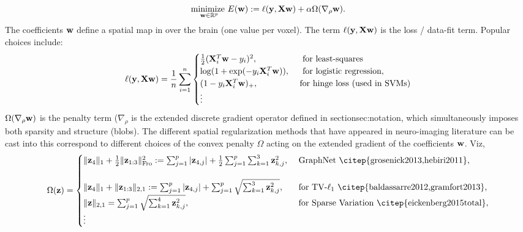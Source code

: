 \begin{equation}
  \underset{\mathbf{w} \in \mathbb R^p}{\text{minimize }}E(\mathbf{w}) := \ell(\mathbf{y},\mathbf{X}\mathbf{w}) + \alpha \Omega(\nabla_\rho\mathbf{w}).
    \label{eq:opt_pb}
\end{equation}
The coefficients ${\mathbf{w}}$ define a spatial map in over the brain (one value per voxel).
The term {$\ell(\mathbf{y},\mathbf{X}\mathbf{w})$} is the
  {loss / data-fit term}. Popular choices include:
  $$
  \ell(\mathbf{y},\mathbf{X}\mathbf{w}) = \frac{1}{n}\sum_{i=1}^n\begin{cases}\frac{1}{2}(\mathbf{X}^T_i\mathbf{w} - y_i)^2,
    &\mbox{ \text{ for least-squares}}\\
    \log(1+\exp(-y_i\mathbf{X}_i^T\mathbf{w})),
    &\mbox{ \text{ for logistic regression}},\\
    (1 - y_i\mathbf{X}^T_i\mathbf{w})_+,&\mbox{\text{ for hinge loss (used in SVMs)}}\\
      \vdots\end{cases}
    $$
$\Omega(\nabla_\rho\mathbf{w})$ is the penalty term ($\nabla_\rho$ is the extended discrete gradient operator defined in section{sec:notation}, which simultaneously imposes both sparsity and structure (blobs). The different spatial regularization
methods that have appeared in neuro-imaging literature can be cast into this
correspond to different choices of the convex penalty $\Omega$ acting on the extended gradient of the coefficients $\mathbf{w}$. Viz,
\[
  \begin{split}
  \Omega(\z) = \begin{cases}
      \|\z_4\|_1 + \frac{1}{2}\|\z_{1:3}\|_{\text{Fro}}^2 := \sum_{j=1}^p|\z_{4,j}| + \frac{1}{2}\sum_{j=1}^{p}\sum_{k=1}^3\z_{k,j}^2, &\mbox{ GraphNet  \citep{grosenick2013,hebiri2011}},\\\\
      \|\z_4\|_1 + \|\z_{1:3}\|_{2,1} := \sum_{j=1}^p|\z_{4,j}| + \sum_{j=1}^{p}\sqrt{\sum_{k=1}^3\z_{k,j}^2}, &\mbox{ for TV-$\ell_1$  \citep{baldassarre2012,gramfort2013}},\\
      \|\z\|_{2,1} = \sum_{j=1}^{p}\sqrt{\sum_{k=1}^4\z_{k,j}^2}, &\mbox{ for Sparse Variation  \citep{eickenberg2015total}},\\
      \vdots
    \end{cases}
  \end{split}
\]
